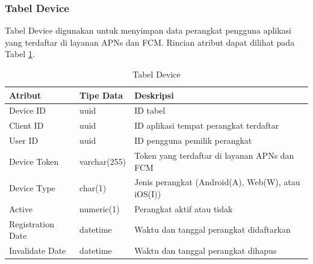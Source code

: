 \subsubsection{Tabel Device}
\par Tabel Device digunakan untuk menyimpan data perangkat pengguna aplikasi yang terdaftar di layanan APNs dan FCM. Rincian atribut dapat dilihat pada Tabel \ref{tabel_device}.
\begin{longtable}{|p{2cm}|p{2.5cm}|p{4.5cm}|}
	\caption{Tabel Device} \label{tabel_device} \\ \hline
    \rowcolor{lightgray} {Atribut} & {Tipe Data} & {Deskripsi} \\ \hline
    \endhead
    Device ID & uuid & ID tabel \\ \hline
    Client ID & uuid & ID aplikasi tempat perangkat terdaftar \\ \hline
    User ID & uuid & ID pengguna pemilik perangkat \\ \hline
    Device Token & varchar(255) & Token yang terdaftar di layanan APNs dan FCM \\ \hline
    Device Type & char(1) & Jenis perangkat (Android(A), Web(W), atau iOS(I)) \\ \hline
    Active & numeric(1) & Perangkat aktif atau tidak \\ \hline
    Registration Date & datetime & Waktu dan tanggal perangkat didaftarkan \\ \hline
    Invalidate Date & datetime & Waktu dan tanggal perangkat dihapus \\ \hline
\end{longtable}

